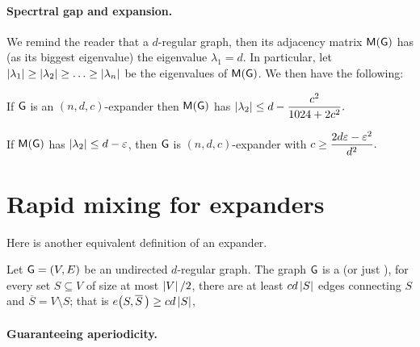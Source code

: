 \paragraph*{Specrtral gap and expansion.}

We remind the reader that a $d$-regular graph, then its adjacency
matrix $\mathsf{M}(\mathsf{G})$ has (as its biggest eigenvalue) the eigenvalue
$\lambda_1 =d$. In particular, let
$\left| {\lambda_1} \right| \geq \left| {\lambda_2} \right| \geq \ldots \geq
\left| {\lambda_n} \right|$ be the eigenvalues of $\mathsf{M}(\mathsf{G})$. We then
have the following:

\begin{theorem}
    If $\mathsf{G}$ is an $(n,d,c)$-expander then $\mathsf{M}(\mathsf{G})$ has
    \begin{math}
        \ds%
        \cardin{\lambda_2} \leq d - \frac{c^2}{1024+2c^2}.
    \end{math}
\end{theorem}

\begin{theorem}
    If $\mathsf{M}(\mathsf{G})$ has $\left| {\lambda_2} \right| \leq d - {\varepsilon}$, then
    $\mathsf{G}$ is $(n,d,c)$-expander with
    \begin{math}
        \displaystyle
        c \geq \frac{2d {\varepsilon} - {\varepsilon}^2}{d^2}.
    \end{math}
\end{theorem}

\section{Rapid mixing for expanders}


Here is another equivalent definition of an expander.
\begin{defn}
    Let $\mathsf{G}=(V,E)$ be an undirected $d$-regular graph.  The graph
    $\mathsf{G}$ is a
     (or just
    ), for every set
    $S \subseteq V$ of size at most $\left| {V} \right|/2$, there are at least
    $c d \left| {S} \right|$ edges connecting $S$ and
    $\overline{S} = V \setminus S$; that is
    $ e\bigl( S, \overline{S} \, \bigr) \geq c d \left| {S} \right|$,
\end{defn}


\paragraph*{Guaranteeing aperiodicity.}

